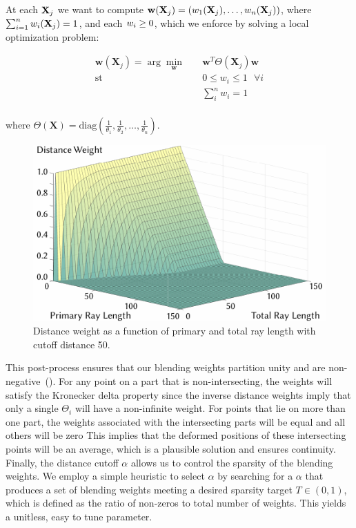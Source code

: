 At each $\mathbf{X}_j$ we want to compute $\mathbf{w}(\mathbf{X}_j) =  \left( w_1(\mathbf{X}_j), \dots, w_n(\mathbf{X}_j) \right)$, where 
$\sum_{i=1}^nw_i(\mathbf{X}_j) = 1$, and each $w_i \geq 0$, which we enforce by solving a local optimization problem: 

\begin{equation}
\begin{aligned}
\mathbf{w}(\mathbf{X}_j) =  \arg\min_{\mathbf{w}} \quad & \mathbf{w}^T \Theta(\mathbf{X}_j) \mathbf{w}    \\
\textrm{st} \quad & 0 \leq w_i \leq 1 \mbox{ }\forall i                    \\
                  &   \sum_i^n w_i = 1                      \\
\end{aligned}
\end{equation}

where $\Theta(\mathbf{X}) = \text{diag}\left( \frac{1}{\theta_1},\frac{1}{\theta_2},\dots,\frac{1}{\theta_n}\right)$. 

\begin{figure}
    \begin{center}
            \includegraphics[width=0.3\columnwidth]{figures/plot_distance_weight.pdf}
            
    \end{center}
    \caption{ \label{fig:plot_distance_weight} Distance weight as a function of primary and total ray length with cutoff distance 50.}
  \end{figure}


This post-process ensures that our blending weights partition unity and are non-negative~(). 
For any point on a part that is non-intersecting, the weights will satisfy the Kronecker delta property since the inverse distance weights imply that only
a single $\Theta_i$ will have a non-infinite weight. 
For points that lie on more than one part, the weights associated with the intersecting parts will be equal and all others will be zero
This implies that the deformed positions of these intersecting points will be an average, which is a plausible solution and ensures continuity.
Finally, the distance cutoff $\alpha$ allows us to control the sparsity of the blending weights. We employ a simple heuristic to select $\alpha$ by searching for a $\alpha$ that produces a set of blending weights meeting a desired sparsity target $T \in \left( 0,1\right)$, which is defined as the ratio of non-zeros to total number of weights. This yields a unitless, easy to tune parameter.

